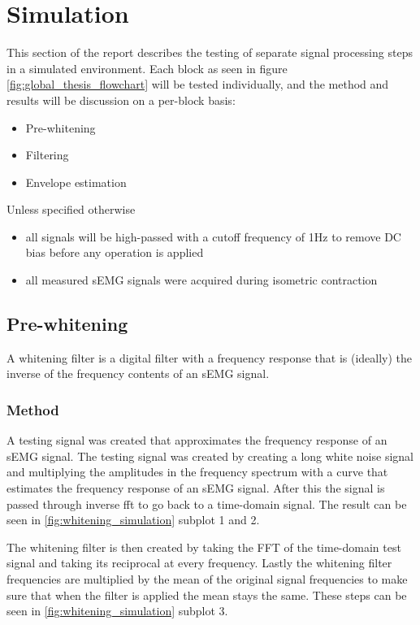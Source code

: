 \chapter{Simulation}
This section of the report describes the testing of separate signal processing steps in a simulated environment. Each block as seen in figure \ref{fig:global_thesis_flowchart} will be tested individually, and the method and results will be discussion on a per-block basis:
\begin{itemize}
    \item Pre-whitening
    \item Filtering
    \item Envelope estimation
\end{itemize}

Unless specified otherwise
\begin{itemize}
    \item all signals will be high-passed with a cutoff frequency of 1Hz to remove DC bias before any operation is applied
    \item all measured sEMG signals were acquired during isometric contraction
\end{itemize}

\section{Pre-whitening}
A whitening filter is a digital filter with a frequency response that is (ideally) the inverse of the frequency contents of an sEMG signal. 

\subsection{Method}
A testing signal was created that approximates the frequency response of an sEMG signal. The testing signal was created by creating a long white noise signal and multiplying the amplitudes in the frequency spectrum with a curve that estimates the frequency response of an sEMG signal. After this the signal is passed through inverse fft to go back to a time-domain signal. The result can be seen in \ref{fig:whitening_simulation} subplot 1 and 2.

The whitening filter is then created by taking the FFT of the time-domain test signal and taking its reciprocal at every frequency. Lastly the whitening filter frequencies are multiplied by the mean of the original signal frequencies to make sure that when the filter is applied the mean stays the same. These steps can be seen in \ref{fig:whitening_simulation} subplot 3. 

